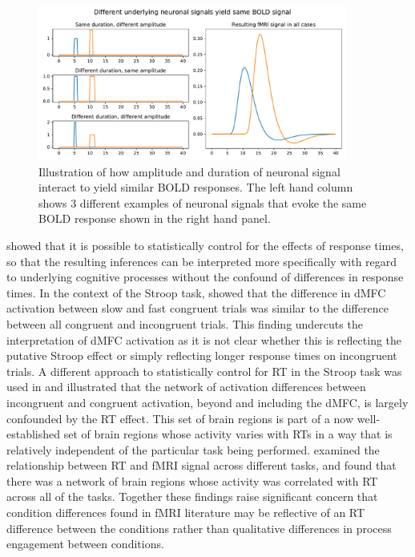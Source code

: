 \documentclass[titlepage,12pt] {article}
\begin{document}
\begin{figure}[h!]
  \centering
   \includegraphics[width=4in]{Figures/neuron_same_bold.pdf}
   \caption{Illustration of how amplitude and duration of neuronal signal interact to yield similar BOLD responses.  The left hand column shows 3 different examples of neuronal signals that evoke the same BOLD response shown in the right hand panel.   }
  \label{fig:neuron_bold}
 \end{figure}

\citet{grinband_detection_2008} showed that it is possible to statistically control for the effects of response times, so that the resulting inferences can be interpreted more specifically with regard to underlying cognitive processes without the confound of differences in response times.  In the context of the Stroop task, \citet{grinband_dorsal_2011} showed that the difference in dMFC activation between slow and fast congruent trials was similar to the difference between all congruent and incongruent trials.  This finding undercuts the interpretation of dMFC activation as it is not clear whether this is reflecting the putative Stroop effect or simply reflecting longer response times on incongruent trials.  A different approach to statistically control for RT in the Stroop task was used in \citet{carp_conditional_2010} and illustrated that the network of activation differences between incongruent and congruent activation, beyond and including the dMFC, is largely confounded by the RT effect.  This set of brain regions is part of a now well-established set of brain regions whose activity varies with RTs in a way that is relatively independent of the particular task being performed.  \citet{yarkoni_bold_2009} examined the relationship between RT and fMRI signal across different tasks, and found that there was a network of brain regions whose activity was correlated with RT across all of the tasks. Together these findings raise significant concern that condition differences found in fMRI literature may be reflective of an RT difference between the conditions rather than qualitative differences in process engagement between conditions.  
\end{document}
